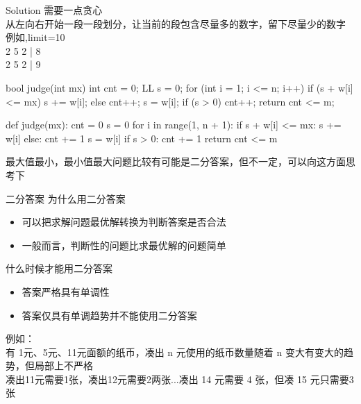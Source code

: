 \documentclass[aspectratio=169,xcolor=dvipsnames]{beamer}
\begin{document}
\begin{frame}[fragile]{Solution}
    需要一点贪心\\
    从左向右开始一段一段划分，让当前的段包含尽量多的数字，留下尽量少的数字\\
    例如,limit=10\\
    2 5 2 | 8\\
    2 5 2 | 9\\

    \begin{minipage}{0.45\textwidth}
        \centering
        \begin{cppcode}
    bool judge(int mx) {
        int cnt = 0;
        LL s = 0;
        for (int i = 1; i <= n; i++) {
            if (s + w[i] <= mx) {
                s += w[i];
            } else {
                cnt++;
                s = w[i];
            }
        }
        if (s > 0)
            cnt++;
        return cnt <= m;
    }
        \end{cppcode}
    \end{minipage}%
    \hfill
    \begin{minipage}{0.45\textwidth}
        \centering
        \begin{pycode}
    def judge(mx):
        cnt = 0
        s = 0
        for i in range(1, n + 1):
            if s + w[i] <= mx:
                s += w[i]
            else:
                cnt += 1
                s = w[i]
        if s > 0:
            cnt += 1
        return cnt <= m
        \end{pycode}
    \end{minipage}
    最大值最小，最小值最大问题比较有可能是二分答案，但不一定，可以向这方面思考下
\end{frame}

\begin{frame}{二分答案}
    为什么用二分答案
    \begin{itemize}
        \item 可以把求解问题最优解转换为判断答案是否合法
        \item 一般而言，判断性的问题比求最优解的问题简单
    \end{itemize}

    什么时候才能用二分答案
    \begin{itemize}
        \item 答案严格具有单调性
        \item 答案仅具有单调趋势并不能使用二分答案
    \end{itemize}
    例如： \\
    有 1元、5元、11元面额的纸币，凑出 n 元使用的纸币数量随着 n 变大有变大的趋势，但局部上不严格\\
    凑出11元需要1张，凑出12元需要2两张...凑出 14 元需要 4 张，但凑 15 元只需要3张
\end{frame}
\end{document}
